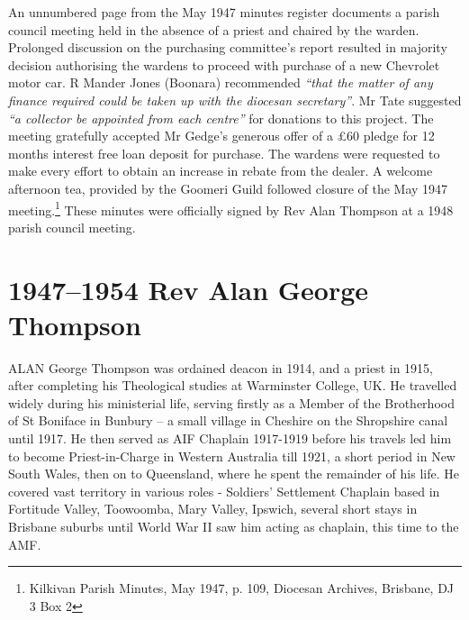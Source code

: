 An unnumbered page from the May 1947 minutes register documents a parish council meeting held in the absence of a priest and chaired by the warden. Prolonged discussion on the purchasing committee's report resulted in majority decision authorising the wardens to proceed with purchase of a new Chevrolet motor car. R Mander Jones (Boonara) recommended \emph{``that the matter of any finance required could be taken up with the diocesan secretary''}. Mr Tate suggested \emph{``a collector be appointed from each centre''} for donations to this project. The meeting gratefully accepted Mr Gedge's generous offer of a \pounds60 pledge for 12 months interest free loan deposit for purchase. The wardens were requested to make every effort to obtain an increase in rebate from the dealer. A welcome afternoon tea, provided by the Goomeri Guild followed closure of the May 1947 meeting.\footnote{Kilkivan Parish Minutes, May 1947, p. 109, Diocesan Archives, Brisbane, DJ 3 Box 2} These minutes were officially signed by Rev Alan Thompson at a 1948 parish council meeting.


\balance


\printendnotes[custom]
\setcounter{endnote}{0}




\chapter{1947--1954 Rev Alan George Thompson}
\nobalance


\lettrine[lines=3]{A}{LAN}
 George Thompson was ordained deacon in 1914, and a priest in 1915, after completing his Theological studies at Warminster College, UK. He travelled widely during his ministerial life, serving firstly as a Member of the Brotherhood of St Boniface in Bunbury -- a small village in Cheshire on the Shropshire canal until 1917. He then served as AIF Chaplain 1917-1919 before his travels led him to become Priest-in-Charge in Western Australia till 1921, a short period in New South Wales, then on to Queensland, where he spent the remainder of his life. He covered vast territory in various roles - Soldiers' Settlement Chaplain based in Fortitude Valley, Toowoomba, Mary Valley, Ipswich, several short stays in Brisbane suburbs until World War II saw him acting as chaplain, this time to the AMF.

